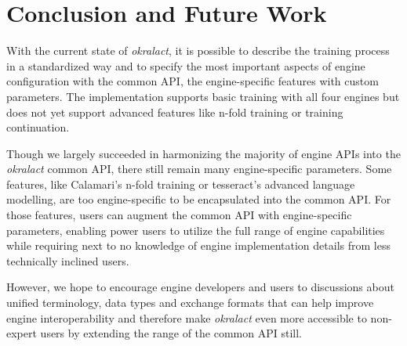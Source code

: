\documentclass[conference]{IEEEtran}
\begin{document}
\section{Conclusion and Future Work}

With the current state of \textit{okralact}, it is possible to describe the
training process in a standardized way and to specify the most important aspects 
of engine configuration with the common API, the engine-specific features with custom
parameters. The implementation supports basic training with all four engines
but does not yet support advanced features like n-fold training or training
continuation.





Though we largely succeeded in harmonizing the majority of engine APIs into the
\textit{okralact} common API, there still remain many engine-specific parameters. Some
features, like Calamari's n-fold training or tesseract's advanced language
modelling, are too engine-specific to be encapsulated into the common API. 
For those features, users can augment the common API with engine-specific parameters, 
enabling power users to utilize the full range of engine capabilities while requiring 
next to no knowledge of engine implementation details from less technically inclined users.

However, we hope to encourage engine developers and
users to discussions about unified terminology, data types and exchange 
formats that can help improve engine interoperability and therefore 
make \textit{okralact} even more accessible to non-expert users by extending
the range of the common API still.


\end{document}
